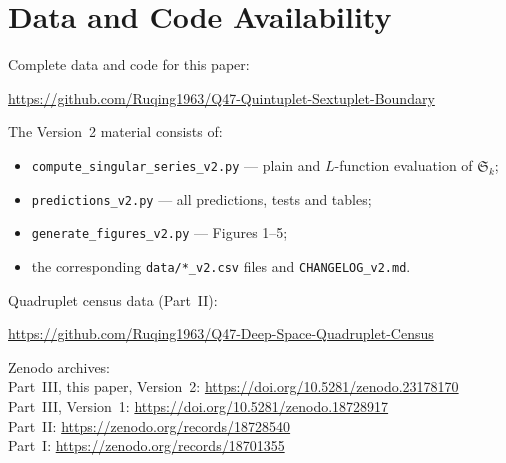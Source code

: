 ﻿\documentclass[11pt,a4paper]{article}
\newcommand{\Sk}[1]{\mathfrak{S}_{#1}}
\begin{document}
\section*{Data and Code Availability}

Complete data and code for this paper:
\begin{center}
\url{https://github.com/Ruqing1963/Q47-Quintuplet-Sextuplet-Boundary}
\end{center}
\noindent The Version~2 material consists of:
\begin{itemize}[nosep]
  \item \texttt{compute\_singular\_series\_v2.py} --- plain and $L$-function evaluation of $\Sk{k}$;
  \item \texttt{predictions\_v2.py} --- all predictions, tests and tables;
  \item \texttt{generate\_figures\_v2.py} --- Figures 1--5;
  \item the corresponding \texttt{data/*\_v2.csv} files and \texttt{CHANGELOG\_v2.md}.
\end{itemize}
\noindent Quadruplet census data (Part~II):
\begin{center}
\url{https://github.com/Ruqing1963/Q47-Deep-Space-Quadruplet-Census}
\end{center}
\noindent Zenodo archives: \\
Part~III, this paper, Version~2: \url{https://doi.org/10.5281/zenodo.23178170} \\
Part~III, Version~1: \url{https://doi.org/10.5281/zenodo.18728917} \\
Part~II: \url{https://zenodo.org/records/18728540} \\
Part~I: \url{https://zenodo.org/records/18701355}
\end{document}
